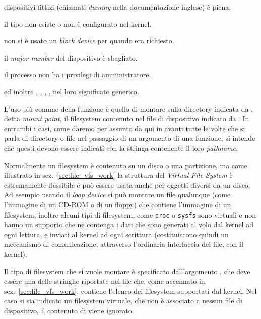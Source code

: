 \begin{funcproto}
{\begin{errlist}
    dispositivi fittizi (chiamati \textit{dummy} nella documentazione inglese)
    è piena.
  \item[\errcode{ENODEV}] il tipo  non esiste o non è
    configurato nel kernel.
  \item[\errcode{ENOTBLK}] non si è usato un \textit{block device} per
     quando era richiesto.
  \item[\errcode{ENXIO}] il \textit{major number} del
    dispositivo  è sbagliato.
  \item[\errcode{EPERM}] il processo non ha i privilegi di amministratore.
  \end{errlist} 
  ed inoltre , , ,
  ,  nel loro significato generico.}
\end{funcproto}


L'uso più comune della funzione è quello di montare sulla directory indicata
da , detta \textit{mount point}, il filesystem contenuto nel
file di dispositivo indicato da . In entrambi i casi, come
daremo per assunto da qui in avanti tutte le volte che si parla di directory o
file nel passaggio di un argomento di una funzione, si intende che questi
devono essere indicati con la stringa contenente il loro \textit{pathname}.

Normalmente un filesystem è contenuto su un disco o una partizione, ma come
illustrato in sez.~\ref{sec:file_vfs_work} la struttura del \textit{Virtual
  File System} è estremamente flessibile e può essere usata anche per oggetti
diversi da un disco. Ad esempio usando il \textit{loop device} si può montare
un file qualunque (come l'immagine di un CD-ROM o di un floppy) che contiene
l'immagine di un filesystem, inoltre alcuni tipi di filesystem, come
\texttt{proc} o \texttt{sysfs} sono virtuali e non hanno un supporto che ne
contenga i dati che sono generati al volo dal kernel ad ogni lettura, e
inviati al kernel ad ogni scrittura (costituiscono quindi un meccanismo di
comunicazione, attraverso l'ordinaria interfaccia dei file, con il kernel).

Il tipo di filesystem che si vuole montare è specificato
dall'argomento , che deve essere una delle stringhe
riportate nel file  che, come accennato in
sez.~\ref{sec:file_vfs_work}, contiene l'elenco dei filesystem supportati dal
kernel. Nel caso si sia indicato un filesystem virtuale, che non è associato a
nessun file di dispositivo, il contenuto di  viene ignorato.

